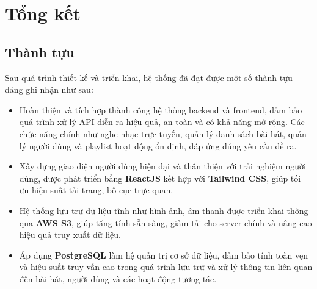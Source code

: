 \documentclass[a4paper,12pt]{article}
\begin{document}
\newpage


\newpage
\section{Tổng kết}
\subsection{Thành tựu}
Sau quá trình thiết kế và triển khai, hệ thống đã đạt được một số thành tựu đáng ghi nhận như sau:
\begin{itemize}
    \item Hoàn thiện và tích hợp thành công hệ thống backend và frontend, đảm bảo quá trình xử lý API diễn ra hiệu quả, an toàn và có khả năng mở rộng. Các chức năng chính như nghe nhạc trực tuyến, quản lý danh sách bài hát, quản lý người dùng và playlist hoạt động ổn định, đáp ứng đúng yêu cầu đề ra.
    
    \item Xây dựng giao diện người dùng hiện đại và thân thiện với trải nghiệm người dùng, được phát triển bằng \textbf{ReactJS} kết hợp với \textbf{Tailwind CSS}, giúp tối ưu hiệu suất tải trang, bố cục trực quan.
    
    \item Hệ thống lưu trữ dữ liệu tĩnh như hình ảnh, âm thanh được triển khai thông qua \textbf{AWS S3}, giúp tăng tính sẵn sàng, giảm tải cho server chính và nâng cao hiệu quả truy xuất dữ liệu.
    
    \item Áp dụng \textbf{PostgreSQL} làm hệ quản trị cơ sở dữ liệu, đảm bảo tính toàn vẹn và hiệu suất truy vấn cao trong quá trình lưu trữ và xử lý thông tin liên quan đến bài hát, người dùng và các hoạt động tương tác.
    
\end{itemize}
\end{document}
